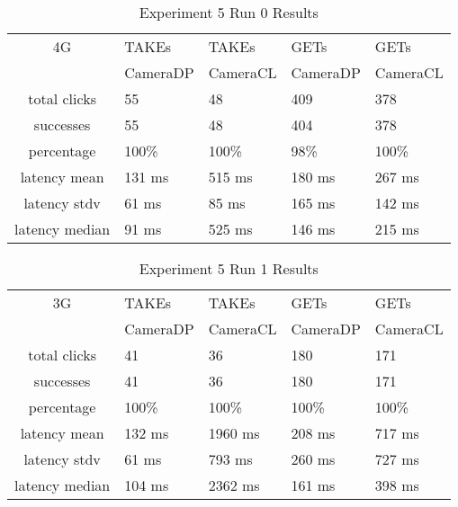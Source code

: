 \begin{table}[htb]
\begin{scriptsize} 
\caption{Experiment 5 Run 0 Results} 
\label{table:exp-5-run0-results}
 \begin{center}
 \begin{tabular}{| c | p{1.5cm} | p{1.5cm} | p{1.5cm} | p{1.4cm} |}
  \hline
  4G & TAKEs & TAKEs & GETs & GETs \\
  & CameraDP & CameraCL & CameraDP & CameraCL \\
  \hline
  total clicks & 55 & 48 & 409 & 378 \\
  \hline
  successes & 55 & 48 & 404 & 378 \\
  \hline
  percentage & 100\% & 100\% & 98\% & 100\% \\
  \hline
  latency mean & 131 ms & 515 ms & 180 ms & 267 ms \\
  \hline
  latency stdv & 61 ms & 85 ms & 165 ms & 142 ms \\
  \hline
  latency median & 91 ms & 525 ms & 146 ms & 215 ms \\
  \hline
  \end{tabular}

  \end{center}
\end{scriptsize}
\end{table}
\begin{table}[htb]
\begin{scriptsize} 
\caption{Experiment 5 Run 1 Results} 
\label{table:exp-5-run1-results}
 \begin{center}
 \begin{tabular}{| c | p{1.5cm} | p{1.5cm} | p{1.5cm} | p{1.4cm} |}
  \hline
  3G & TAKEs & TAKEs & GETs & GETs \\
  & CameraDP & CameraCL & CameraDP & CameraCL \\
  \hline
  total clicks & 41 & 36 & 180 &  171 \\
  \hline
  successes & 41 & 36 & 180 & 171 \\
  \hline
  percentage & 100\% & 100\% & 100\% & 100\% \\
  \hline
  latency mean & 132 ms & 1960 ms & 208 ms & 717 ms \\
  \hline
  latency stdv & 61 ms & 793 ms & 260 ms & 727 ms \\
  \hline
  latency median & 104 ms & 2362 ms & 161 ms & 398 ms \\
  \hline
  \end{tabular}
  \end{center}
\end{scriptsize}
\end{table}

